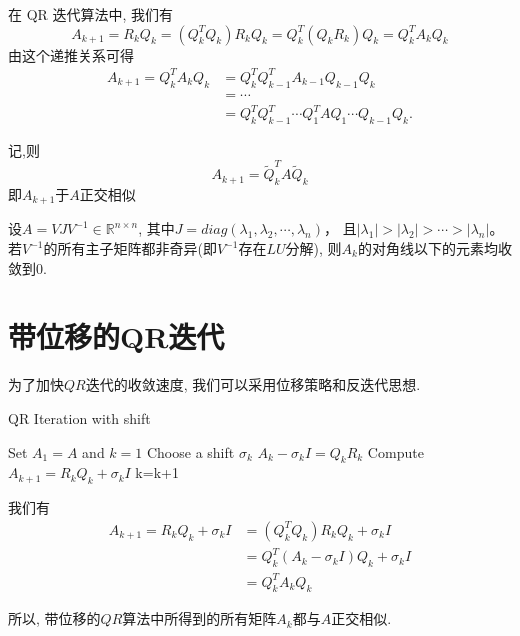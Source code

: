在 QR 迭代算法中, 我们有
\[
A_{k+1}=R_kQ_k=(Q_k^TQ_k)R_kQ_k=Q^T_k(Q_kR_k)Q_k=Q_k^TA_kQ_k\]
由这个递推关系可得
\begin{align*}
A_{k+1}=Q_k^TA_kQ_k&=Q^T_kQ^T_{k-1}A_{k-1}Q_{k-1}Q_k\\
&=\cdots\\
&=Q^T_kQ^T_{k-1}\cdots Q^T_1AQ_1\cdots Q_{k-1}Q_k.
\end{align*}

记,则
\[A_{k+1}={\tilde Q}_k^TA{\tilde Q}_k\]
即$A_{k+1}$于$A$正交相似

\begin{theo}[QR 迭代的收敛性]
设$A=VJV^{-1}\in \mathbb{R}^{n\times n}$,
其中$J=diag(\lambda_1,\lambda_2,\cdots,\lambda_n)$，
且$|\lambda_1|>|\lambda_2|>\cdots>|\lambda_n|$。
若$V^{-1}$的所有主子矩阵都非奇异(即$V^{-1}$存在$LU$分解),
则$A_k$的对角线以下的元素均收敛到0.
\end{theo}

\newpage
\section{带位移的QR迭代}
为了加快$QR$迭代的收敛速度, 我们可以采用位移策略和反迭代思想.
\begin{algorithm}[h]  
\caption{QR Iteration with shift}  
\begin{algorithmic}[1]  
\STATE Set $A_1=A$ and $k=1$
\STATE Choose a shift $\sigma_k$
\STATE ${A_{k}-\sigma_kI} = Q_k R_k$
\STATE Compute $A_{k+1}=R_k Q_k+\sigma_kI$
\STATE k=k+1
\ENDWHILE
\end{algorithmic}  
\end{algorithm}  

我们有
\begin{align*}
A_{k+1}=R_kQ_k+\sigma_kI&=(Q^T_kQ_k)R_kQ_k+\sigma_kI\\
&=Q^T_k(A_k-\sigma_kI)Q_k+\sigma_kI\\
&=Q^T_kA_kQ_k
\end{align*}

所以, 带位移的$QR$算法中所得到的所有矩阵$A_k$都与$A$正交相似.

\newpage
